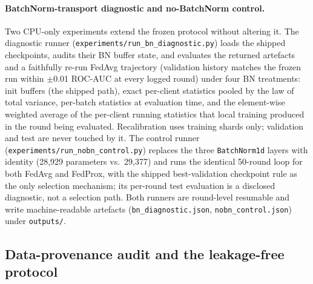 \paragraph{BatchNorm-transport diagnostic and no-BatchNorm control.}
Two CPU-only experiments extend the frozen protocol without altering
it. The diagnostic runner (\texttt{experiments/run\_bn\_diagnostic.py})
loads the shipped checkpoints, audits their BN buffer state, and
evaluates the returned artefacts and a faithfully re-run FedAvg
trajectory (validation history matches the frozen run within
$\pm$0.01 ROC-AUC at every logged round) under four BN treatments:
init buffers (the shipped path), exact per-client statistics pooled by
the law of total variance, per-batch statistics at evaluation time,
and the element-wise weighted average of the per-client running
statistics that local training produced in the round being evaluated.
Recalibration uses training shards only; validation and test are never
touched by it. The control runner
(\texttt{experiments/run\_nobn\_control.py}) replaces the three
\texttt{BatchNorm1d} layers with identity (28{,}929 parameters
vs.\ 29{,}377) and runs the identical 50-round loop for both
FedAvg and FedProx, with the shipped best-validation checkpoint rule
as the only selection mechanism; its per-round test evaluation is a
disclosed diagnostic, not a selection path. Both runners are
round-level resumable and write machine-readable artefacts
(\texttt{bn\_diagnostic.json}, \texttt{nobn\_control.json}) under
\texttt{outputs/}.

\subsection{Data-provenance audit and the leakage-free protocol}
\label{sec:provenance}

